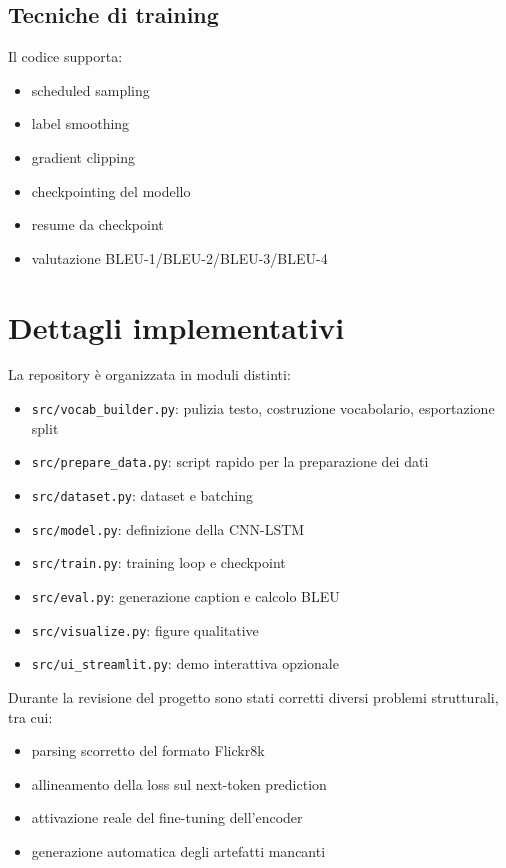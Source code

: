 \documentclass[11pt,a4paper]{article}
\begin{document}
\subsection{Tecniche di training}

Il codice supporta:
\begin{itemize}[leftmargin=*]
    \item scheduled sampling
    \item label smoothing
    \item gradient clipping
    \item checkpointing del modello
    \item resume da checkpoint
    \item valutazione BLEU-1/BLEU-2/BLEU-3/BLEU-4
\end{itemize}

\section{Dettagli implementativi}

La repository è organizzata in moduli distinti:
\begin{itemize}[leftmargin=*]
    \item \texttt{src/vocab\_builder.py}: pulizia testo, costruzione vocabolario, esportazione split
    \item \texttt{src/prepare\_data.py}: script rapido per la preparazione dei dati
    \item \texttt{src/dataset.py}: dataset e batching
    \item \texttt{src/model.py}: definizione della CNN-LSTM
    \item \texttt{src/train.py}: training loop e checkpoint
    \item \texttt{src/eval.py}: generazione caption e calcolo BLEU
    \item \texttt{src/visualize.py}: figure qualitative
    \item \texttt{src/ui\_streamlit.py}: demo interattiva opzionale
\end{itemize}

Durante la revisione del progetto sono stati corretti diversi problemi strutturali, tra cui:
\begin{itemize}[leftmargin=*]
    \item parsing scorretto del formato Flickr8k
    \item allineamento della loss sul next-token prediction
    \item attivazione reale del fine-tuning dell'encoder
    \item generazione automatica degli artefatti mancanti
\end{itemize}
\end{document}
